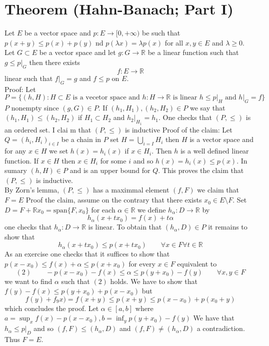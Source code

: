 \documentclass[11pt]{article}
\begin{document}
\section{Theorem (Hahn-Banach; Part I)}
Let $E$ be a vector space and $p : E \rightarrow [0,+\infty)$ be such that $p(x + y) \le p(x) + p(y)$
nd $p(\lambda x) = \lambda p(x)$ for all $x,y \in E$ and  $\lambda \ge 0$. Let $G \subset E$ be a vector space
and let $g : G \rightarrow \mathbb{R}$ be a linear function such that $g \le p|_G$ then there exists
 \[
f : E \rightarrow \mathbb{R}
\] 
linear such that $f|_G = g$ and  $f \le p$ on  $E$.
\\
Proof: Let 
 \[
     P = \{ (h,H) : H \subset E \text{ is a vecetor space and $h: H \rightarrow \mathbb{R}$ is linear $h \le p|_H$ and $h|_G = f$}\} 
\] 
$P$ nonempty since  $(g, G) \in P$. If  $(h_1, H_1), (h_2, H_2) \in P$ we say that $(h_1 ,H_1) \le (h_2, H_2)$ if 
$H_1 \subset H_2$ and $h_2|_{H_1} = h_1$. One checks that $(P, \le)$ is an ordered set.
I clai m that  $(P ,\le)$ is inductive
Proof of the claim: Let  $Q = (h_i,H_i)_{i \in I}$ be a chain in  $P$ set  $H = \bigcup_{i=I} H_i$ then  $H$ is a vector space and for any $x \in H$ we set  $h(x) = h_i(x)$ if  $x \in H_i$.
Then $h$ is a well defined linear function.
If $x \in H$ then  $x \in H_i$ for some  $i$ and so  $h(x) = h_i(x) \le p(x)$. In sumary  $(h,H) \in P$ and is an upper bound for $Q$. This proves the claim that  $(P, \le)$ is inductive.\\
By Zorn's lemma, $(P , \le)$ has a maximmal element $(f, F)$ we claim that  $F = E$ Proof the claim, assume
on the contrary that there exists $x_0 \in E \setminus F$. Set $D = F +  \mathbb{R} x_0 = \text{span}\{F, x_0\}$ for each $\alpha \in \mathbb{R}$ we define $h_\alpha : D \rightarrow \mathbb{R}$ by
\[
h_\alpha(x + tx_0) = f(x) + t\alpha
\] 
one checks that $h_\alpha: D \rightarrow \mathbb{R}$ is linear. To obtain that $(h_\alpha, D) \in P$ it remains to show that
\[
h_\alpha(x + t x_0) \le p(x + tx_0) \qquad \forall x \in F \forall t \in \mathbb{R}
\] 
As an exercise one checks that it suffices to show that $p(x - x_0) \le f(x) + \alpha \le p(x + x_0)$ for every $x \in F$
equivalent to 
 \[
     (2) \qquad  -p(x-x_0) - f(x)\le \alpha \le p(y + x_0) - f(y) \qquad \forall x,y \in F
\] 
we want to find $\alpha$ such that $(2)$ holds. We have to show that $f(y) - f(x) \le p(y+x_0) + p(x - x_0)$ but
\[
f(y) + f_9x) = f(x+y) \le p(x + y) \le p(x - x_0) + p(x_0+ y)
\] 
which concludes the proof. Let $\alpha \in [a,b]$ where $a = \sup_{x} f(x) - p(x-x_0), b = \inf_{y} p(y+x_0) - f(y)$ 
We have that $h_\alpha \le p|_D$ and so $(f,F) \le (h_\alpha,D)$ and $(f,F) \ne (h_\alpha, D)$ a contradiction. Thus $F = E$.
\end{document}
